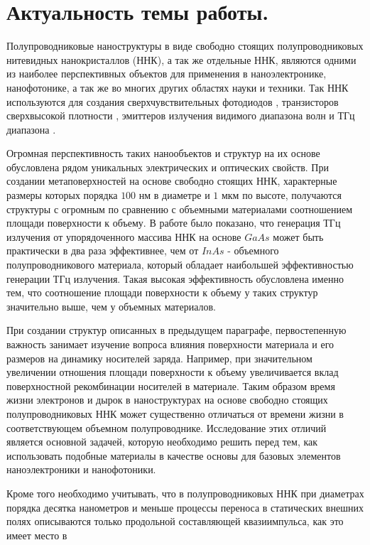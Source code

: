 \documentclass[a4paper,14pt,russian]{extreport}
\begin{document}
		\section{Актуальность темы работы.}
		Полупроводниковые наноструктуры в виде свободно стоящих
полупроводниковых нитевидных нанокристаллов (ННК), а так же отдельные ННК, являются одними из наиболее перспективных объектов для применения в наноэлектронике,
нанофотонике, а так же во многих других областях науки и техники. Так ННК используются для создания
сверхчувствительных фотодиодов \cite{semicondNNW2006}, транзисторов сверхвысокой плотности \cite{NNWtransistors}, эмиттеров излучения видимого диапазона волн \cite{singleNNWlaser} и ТГц диапазона \cite{THzGeneration}.\par
Огромная перспективность таких нанообъектов и структур на их основе обусловлена рядом уникальных электрических и оптических свойств. При создании метаповерхностей на основе свободно стоящих ННК, характерные размеры которых порядка $100 \text{ нм}$ в диаметре и $1 \text{ мкм}$ по высоте, получаются структуры с огромным по сравнению с объемными материалами соотношением площади поверхности к объему. В работе \cite{CorrectCite} было показано, что генерация ТГц излучения от упорядоченного массива ННК на основе $GaAs$ может быть практически в два раза эффективнее, чем от $InAs$ - объемного полупроводникового материала, который обладает наибольшей эффективностью генерации ТГц излучения. Такая высокая эффективность обусловлена именно тем, что соотношение площади поверхности к объему у таких структур значительно выше, чем у объемных материалов.\par
 При создании структур описанных в предыдущем параграфе, первостепенную важность занимает изучение вопроса влияния поверхности материала и его размеров на динамику носителей заряда. Например, при значительном увеличении отношения площади поверхности к объему увеличивается вклад поверхностной рекомбинации носителей в материале. Таким образом время жизни электронов и дырок в наноструктурах на основе свободно стоящих полупроводниковых ННК может существенно отличаться от времени жизни в соответствующем объемном полупроводнике. Исследование этих отличий является основной задачей, которую необходимо решить перед тем, как использовать подобные материалы в качестве основы для базовых элементов наноэлектроники и нанофотоники.\par
Кроме того необходимо учитывать, что в полупроводниковых ННК при диаметрах порядка десятка нанометров и меньше процессы переноса в статических внешних полях описываются только продольной составляющей квазиимпульса, как это имеет место в
\end{document}
